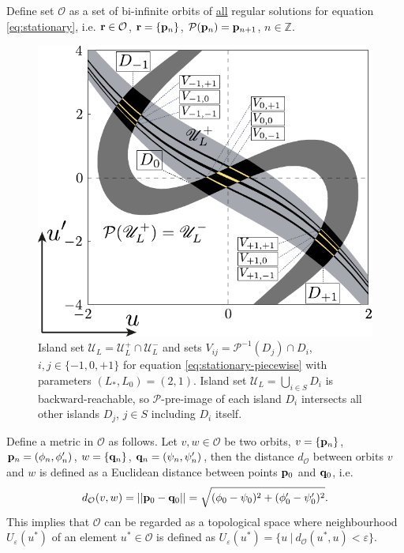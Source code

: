 \begin{definition}
	Define set $\mathcal{O}$ as a set of bi-infinite orbits of \underline{all} regular solutions for equation \eqref{eq:stationary}, i.e. $\vb{r} \in \mathcal{O}$, $\vb{r} = \{ \vb{p}_n \}$, $\mathcal{P}(\vb{p}_n) = \vb{p}_{n+1}$, $n \in \mathbb{Z}$.
\end{definition}

\begin{figure}[h]
\centering
	\includegraphics[scale = 1]{pic/v-strips for piecewise equation}
	\caption{
		Island set $\mathscr{U}_L = \mathscr{U}_L^+ \cap \mathscr{U}_L^-$ and sets $V_{ij} = \mathcal{P}^{-1}(D_j) \cap D_i$, $i, j \in \{ -1, 0, +1 \}$ for equation \eqref{eq:stationary-piecewise} with parameters $(L_*, L_0) = (2, 1)$.
		Island set $\mathscr{U}_L = \bigcup_{i \in S} D_i$ is backward-reachable, so $\mathcal{P}$-pre-image of each island $D_i$ intersects all other islands $D_j$, $j \in S$ including $D_i$ itself.
	}
\label{fig:v-strips-piecewise}
\end{figure}

Define a metric in $\mathcal{O}$ as follows.
Let $v, w \in \mathcal{O}$ be two orbits, $v = \{ \vb{p}_n \}$, $\vb{p}_n = (\phi_n, \phi_n')$, $w = \{ \vb{q}_n \}$, $\vb{q}_n = (\psi_n, \psi_n')$, then the distance $d_{\mathcal{O}}$ between orbits $v$ and $w$ is defined as a Euclidean distance between points $\vb{p}_0$ and $\vb{q}_0$, i.e.
\begin{equation}
	d_{\mathcal{O}}(v, w) = ||\vb{p}_0 - \vb{q}_0 || = \sqrt{(\phi_0 - \psi_0)^2 + (\phi_0' - \psi_0')^2}.
\end{equation}
This implies that $\mathcal{O}$ can be regarded as a topological space where neighbourhood $U_{\varepsilon}(u^*)$ of an element $u^* \in \mathcal{O}$ is defined as $U_{\varepsilon}(u^*) = \{u \ | \ d_{\mathcal{O}}(u^*, u) < \varepsilon \}$.

